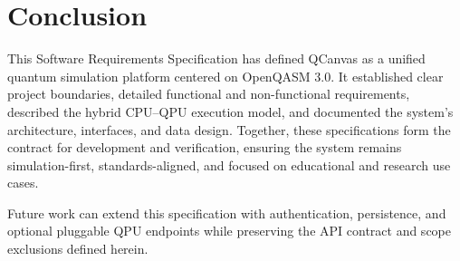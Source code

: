 \chapter{Conclusion}

This Software Requirements Specification has defined QCanvas as a unified quantum simulation platform centered on OpenQASM 3.0. It established clear project boundaries, detailed functional and non-functional requirements, described the hybrid CPU–QPU execution model, and documented the system’s architecture, interfaces, and data design. Together, these specifications form the contract for development and verification, ensuring the system remains simulation-first, standards-aligned, and focused on educational and research use cases.

Future work can extend this specification with authentication, persistence, and optional pluggable QPU endpoints while preserving the API contract and scope exclusions defined herein.
